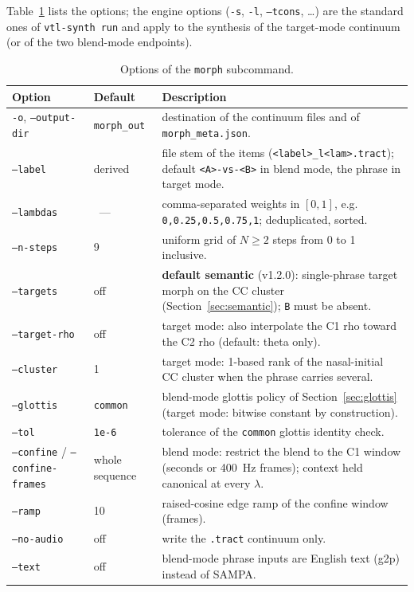 \documentclass[11pt,a4paper]{article}
\newcommand{\lam}{\lambda}
\newcommand{\code}[1]{\texttt{#1}}
\newcommand{\sectref}[1]{Section~\ref{#1}}
\begin{document}
Table~\ref{tab:options} lists the options; the engine options
(\code{-s}, \code{-l}, \code{--tcons}, \ldots) are the standard
ones of \code{vtl-synth run} and apply to the synthesis of the
target-mode continuum (or of the two blend-mode endpoints).

\begin{table}[t]
\centering\small
\caption{Options of the \code{morph} subcommand.}\label{tab:options}
\begin{tabularx}{\textwidth}{@{}l l >{\raggedright\arraybackslash}X@{}}
\toprule
Option & Default & Description \\
\midrule
\code{-o}, \code{--output-dir} & \code{morph\_out} & destination of
the continuum files and of \code{morph\_meta.json}. \\
\code{--label} & derived & file stem of the items
(\code{<label>\_l<lam>.tract}); default \code{<A>-vs-<B>} in blend
mode, the phrase in target mode. \\
\code{--lambdas} &~--- & comma-separated weights in $[0,1]$, e.g.
\code{0,0.25,0.5,0.75,1}; deduplicated, sorted. \\
\code{--n-steps} & 9 & uniform grid of $N \ge 2$ steps from 0 to 1
inclusive. \\
\code{--targets} & off & \textbf{default semantic} (v1.2.0):
single-phrase target morph on the CC cluster
(\sectref{sec:semantic}); \code{B} must be absent. \\
\code{--target-rho} & off & target mode: also interpolate the C1
rho toward the C2 rho (default: theta only). \\
\code{--cluster} & 1 & target mode: 1-based rank of the
nasal-initial CC cluster when the phrase carries several. \\
\code{--glottis} & \code{common} & blend-mode glottis policy of
\sectref{sec:glottis} (target mode: bitwise constant by
construction). \\
\code{--tol} & \code{1e-6} & tolerance of the \code{common} glottis
identity check. \\
\code{--confine} / \code{--confine-frames} & whole sequence &
blend mode: restrict the blend to the C1 window (seconds or 400~Hz
frames); context held canonical at every $\lam$. \\
\code{--ramp} & 10 & raised-cosine edge ramp of the confine window
(frames). \\
\code{--no-audio} & off & write the \code{.tract} continuum only. \\
\code{--text} & off & blend-mode phrase inputs are English text
(g2p) instead of SAMPA. \\
\bottomrule
\end{tabularx}
\end{table}
\end{document}
